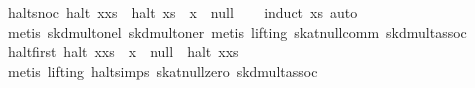 \begin{isabellebody}
\isanewline
{}\isamarkupfalse%
\ halt{}snoc{}\ {}halt\ {}x{}xs{}\ {}\ halt\ xs\ {}\ x\ {}{}\ null{}\isanewline
%
\isadelimproof
\ \ %
\endisadelimproof
%
\isatagproof
{}\isamarkupfalse%
\ {}induct\ xs{}\ auto{}\isanewline
\ \ \isamarkupfalse%
\ {}metis\ skd{}mult{}onel\ skd{}mult{}oner{}\ metis\ {}lifting{}\ skat{}null{}comm\ skd{}mult{}assoc{}%
\endisatagproof
{\isafoldproof}%
%
\isadelimproof
\isanewline
%
\endisadelimproof
\isanewline
{}\isamarkupfalse%
\ halt{}first{}\ {}halt\ {}x{}xs{}\ {}\ x\ {}{}\ null\ {}\ halt\ {}x{}xs{}{}\isanewline
%
\isadelimproof
\ \ %
\endisadelimproof
%
\isatagproof
{}\isamarkupfalse%
\ {}metis\ {}lifting{}\ halt{}simps{}{}{}\ skat{}null{}zero\ skd{}mult{}assoc{}%
\endisatagproof
{\isafoldproof}%
%
\isadelimproof
\isanewline
%
\endisadelimproof

\end{isabellebody}
